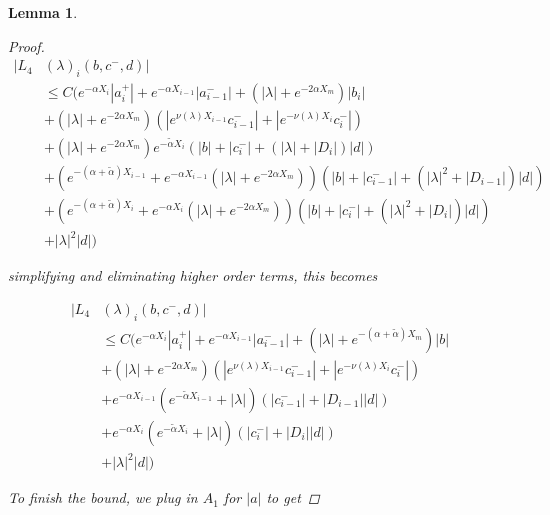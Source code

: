 \documentclass[12pt]{article}
\newtheorem{lemma}{Lemma}
\begin{document}
\begin{lemma}
\begin{proof}
\begin{align*}
|L_4&(\lambda)_i(b, c^-, d)|\\ 
&\leq C \Big( e^{-\alpha X_i} |a_i^+| +  e^{-\alpha X_{i-1}} |a_{i-1}^-| + (|\lambda| + e^{-2 \alpha X_m}) |b_i| \\
&+ (|\lambda| + e^{-2 \alpha X_m})( |e^{\nu(\lambda)X_{i-1}} c_{i-1}^-| + |e^{-\nu(\lambda)X_i} c_i^-|) \\
&+ (|\lambda| + e^{-2 \alpha X_m})e^{-\tilde{\alpha} X_i}(|b| + |c_i^-| + (|\lambda| + |D_i|)|d| ) \\
&+ (e^{-(\alpha + \tilde{\alpha}) X_{i-1}} + e^{-\alpha X_{i-1}} (|\lambda| + e^{-2 \alpha X_m}))( |b| + |c_{i-1}^-| + (|\lambda|^2 + |D_{i-1}|)|d| ) \\
&+ (e^{-(\alpha + \tilde{\alpha}) X_i} + e^{-\alpha X_i} (|\lambda| + e^{-2 \alpha X_m}))( |b| + |c_i^-| + (|\lambda|^2 + |D_i|)|d| ) \\
&+ |\lambda|^2 |d|  \Big)
\end{align*}

simplifying and eliminating higher order terms, this becomes

\begin{align*}
|L_4&(\lambda)_i(b, c^-, d)|\\ 
&\leq C \Big( e^{-\alpha X_i} |a_i^+| +  e^{-\alpha X_{i-1}} |a_{i-1}^-| + (|\lambda| + e^{-(\alpha + \tilde{\alpha}) X_m})|b| \\
&+ (|\lambda| + e^{-2 \alpha X_m})( |e^{\nu(\lambda)X_{i-1}} c_{i-1}^-| + |e^{-\nu(\lambda)X_i} c_i^-|) \\
&+ e^{-\alpha X_{i-1}}( e^{-\tilde{\alpha} X_{i-1}} + |\lambda|)( |c_{i-1}^-| + |D_{i-1}||d| ) \\
&+ e^{-\alpha X_i}( e^{-\tilde{\alpha} X_i} + |\lambda|)( |c_i^-| + |D_i||d| ) \\
&+ |\lambda|^2 |d|  \Big)
\end{align*}

To finish the bound, we plug in $A_1$ for $|a|$ to get


\end{proof}
\end{lemma}
\end{document}
